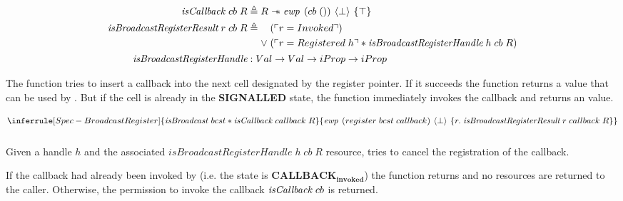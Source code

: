\begin{align*}
  \gsIsCb{}\; cb\; R                            & \triangleq R \wand \ewp{cb\; ()}{\bot}{\top}                                                                    \\
  \emph{isBroadcastRegisterResult}\; r\; cb\; R & \triangleq \begin{aligned}[t]
                                                                      & (\ulcorner r = Invoked \urcorner)                                                           \\
                                                               \vee\; & (\ulcorner r = Registered\; h \urcorner \ast \emph{isBroadcastRegisterHandle}\; h\; cb\; R)
                                                             \end{aligned} \\
  \emph{isBroadcastRegisterHandle}              & : Val \to Val \to iProp \to iProp
\end{align*}

The  function tries to insert a callback into the next cell designated by the register pointer.
If it succeeds the function returns a  value that can be used by .
But if the cell is already in the \textbf{SIGNALLED} state, the function immediately invokes the callback and returns an  value.

\[
  \inferrule[Spec-BroadcastRegister]
  { \gsIsBcst{}\; bcst \ast \gsIsCb{}\; callback\; R }
  { \ewp{register\; bcst\; callback}{\bot}{r.\; \emph{isBroadcastRegisterResult}\; r\; callback\; R}}
\]

\subsubsection{}
\label{sec:broadcast-spec-cance}

Given a handle \(h\) and the associated \(\textit{isBroadcastRegisterHandle}\; h\; cb\; R\) resource,  tries to cancel the registration of the callback.

If the callback had already been invoked by  (i.e. the state is \(\textbf{CALLBACK}_\textbf{invoked}\)) the function returns  and no resources are returned to the caller.
Otherwise, the permission to invoke the callback \(\mathit{isCallback}{}\; cb\) is returned.

